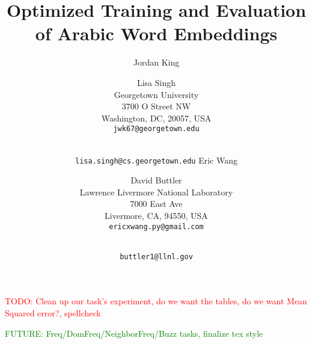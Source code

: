 \documentclass[11pt]{article}
\title{Optimized Training and Evaluation of Arabic Word Embeddings}
\author{Jordan King \and Lisa Singh\\
	    Georgetown University\\
	    3700 O Street NW\\
	    Washington, DC, 20057, USA\\
	    {\tt jwk67@georgetown.edu} \and\\
	    {\tt lisa.singh@cs.georgetown.edu}
	  \And
		Eric Wang \and David Buttler\\
	    Lawrence Livermore National Laboratory\\
	    7000 East Ave\\
	    Livermore, CA, 94550, USA\\
	    {\tt ericxwang.py@gmail.com} \and\\
	    {\tt buttler1@llnl.gov}
	    }
\date{}
\begin{document}
\maketitle

\textcolor{red}{TODO: Clean up our task's experiment, do we want the tables, do we want Mean Squared error?, spellcheck}

\textcolor{green}{FUTURE: Freq/DomFreq/NeighborFreq/Buzz tasks, finalize tex style}















\end{document}
